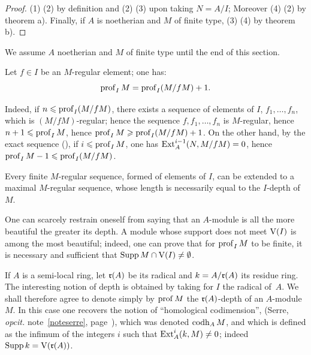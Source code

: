 \begin{proof}
(1) \SSI (2) by definition and (2) \ALORS (3) upon taking \(N=A/I\);
Moreover (4) \ALORS (2) by theorem  a). Finally, if \(A\)
is noetherian and \(M\) of finite type, (3) \ALORS (4) by theorem
 b).
\skipqed
\end{proof}

We assume \(A\) noetherian and \(M\) of finite type until the end of
this section.

\begin{corollary} \label{III.2.5}
Let \(f\in I\) be an \(M\)-regular element; one has:
\[
\operatorname{prof}_I M = \operatorname{prof}_I (M/fM) + 1.
\]
\end{corollary}

Indeed, if \(n\leqslant \operatorname{prof}_I (M/fM)\), there exists a sequence of
elements of \(I\), \(f_1, \ldots, f_n\), which is
\((M/fM)\)-regular; hence the sequence \(f, f_1, \ldots, f_n\) is
\(M\)-regular, hence \(n+1 \leqslant \operatorname{prof}_I M\), hence
\(\operatorname{prof}_I M\geqslant \operatorname{prof}_I (M/fM) + 1\). On the other hand, by the exact
sequence (), if \(i \leqslant \operatorname{prof}_I M\), one has
\(\operatorname{Ext}_A^{i-1} (N, M/fM)=0\), hence
\(\operatorname{prof}_I M - 1 \leqslant \operatorname{prof}_I (M/fM)\).

\begin{corollary} \label{III.2.6}
Every finite \(M\)-regular sequence, formed of elements of \(I\), can
be extended to a maximal \(M\)-regular sequence, whose length is
necessarily equal to the \(I\)-depth of~\(M\).
\end{corollary}

\begin{remark} \label{III.2.7}
One can scarcely restrain oneself from saying that an \(A\)-module is
all the more beautiful the greater its depth. A module whose support
does not meet \(\operatorname{V} (I)\) is among the most beautiful; indeed, one
can prove that for \(\operatorname{prof}_I M\) to be finite, it is necessary and
sufficient that \(\operatorname{Supp} M \cap \operatorname{V}(I) \neq \emptyset\).
\end{remark}

\begin{remark} \label{III.2.8}
If \(A\) is a semi-local ring, let \(\mathfrak{r}(A)\) be its radical and
\(k=A/\mathfrak{r}(A)\) its residue ring. The interesting notion of depth is
obtained by taking for \(I\) the radical of~\(A\). We shall therefore
agree to denote simply by \(\operatorname{prof} M\) the \(\mathfrak{r}(A)\)-depth of an
\(A\)-module~\(M\). In this case one recovers the notion of
``homological codimension'', (\cf Serre, \textit{op\ptbl cit.}
note~\eqref{noteserre}, page~\pageref{noteserre}), which was denoted
\(\operatorname{codh}_A M\), and which is defined as the infimum of the integers
\(i\) such that \(\operatorname{Ext}_A^i(k, M)\neq 0\); indeed
\(\operatorname{Supp} k = \operatorname{V}(\mathfrak{r}(A))\).
\end{remark}

